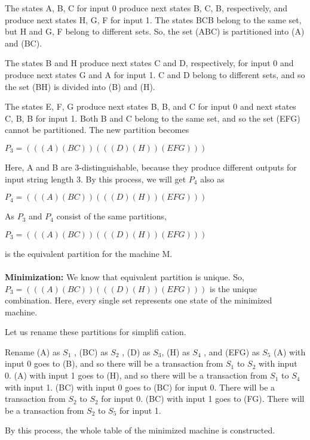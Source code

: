 \documentclass[12pt,a4paper,openany]{book}
\begin{document}
\setcounter{page}{149}

The states A, B, C for input 0 produce next states B, C, B, respectively, and produce next states H, G, F for input 1. The states BCB belong to the same set, but H and G, F belong to different sets. So, the set (ABC) is partitioned into (A) and (BC).

The states B and H produce next states C and D, respectively, for input 0 and produce next states G and A for input 1. C and D belong to different sets, and so the set (BH) is divided into (B) and (H). 

The states E, F, G produce next states B, B, and C for input 0 and next states C, B, B for input 1. Both B and C belong to the same set, and so the set (EFG) cannot be partitioned. The new partition becomes

\begin{center}
$P_3 = (((A) (BC)) (((D) (H)) (EFG)))$
\end{center}
Here, A and B are 3-distinguishable, because they produce different outputs for input string length 3.
By this process, we will get $P_4$ also as

\begin{center}
$P_4 = (((A) (BC)) (((D) (H)) (EFG)))$
\end{center}
As $P_3$ and $P_4$ consist of the same partitions,

\begin{center}
$P_3 = (((A) (BC)) (((D) (H)) (EFG)))$
\end{center}
is the equivalent partition for the machine M.
\\
\\
\textbf{Minimization:} We know that equivalent partition is unique. So, $ P_3 = (((A)(BC)) (((D)(H)) (EFG)))$ is the
unique combination. Here, every single set represents one state of the minimized machine.

Let us rename these partitions for simplifi cation.

Rename (A) as $S_1$ , (BC) as $S_2$ , (D) as $S_3$, (H) as $S_4$ , and (EFG) as $S_5$ (A) with input 0 goes to (B), and so there will be a transaction from $S_1$ to $S_2$ with input 0. (A) with input 1 goes to (H), and so there will be a transaction from $S_1$ to $S_4$ with input 1. (BC) with input 0 goes to (BC) for input 0. There will be a transaction from $S_2$ to $S_2$ for input 0. (BC) with input 1 goes to (FG). There will be a transaction from $S_2$ to $S_5$ for input 1.

By this process, the whole table of the minimized machine is constructed.
\end{document}

